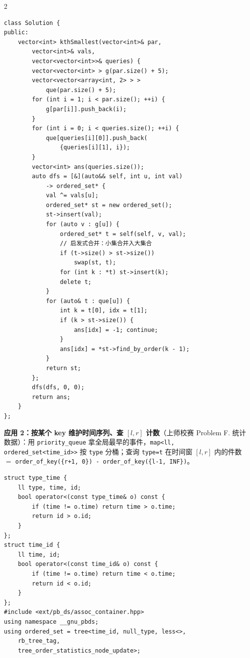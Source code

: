 \begin{multicols*}{2}
\begin{verbatim}
class Solution {
public:
    vector<int> kthSmallest(vector<int>& par,
        vector<int>& vals,
        vector<vector<int>>& queries) {
        vector<vector<int> > g(par.size() + 5);
        vector<vector<array<int, 2> > >
            que(par.size() + 5);
        for (int i = 1; i < par.size(); ++i) {
            g[par[i]].push_back(i);
        }
        for (int i = 0; i < queries.size(); ++i) {
            que[queries[i][0]].push_back(
                {queries[i][1], i});
        }
        vector<int> ans(queries.size());
        auto dfs = [&](auto&& self, int u, int val)
            -> ordered_set* {
            val ^= vals[u];
            ordered_set* st = new ordered_set();
            st->insert(val);
            for (auto v : g[u]) {
                ordered_set* t = self(self, v, val);
                // 启发式合并：小集合并入大集合
                if (t->size() > st->size())
                    swap(st, t);
                for (int k : *t) st->insert(k);
                delete t;
            }
            for (auto& t : que[u]) {
                int k = t[0], idx = t[1];
                if (k > st->size()) {
                    ans[idx] = -1; continue;
                }
                ans[idx] = *st->find_by_order(k - 1);
            }
            return st;
        };
        dfs(dfs, 0, 0);
        return ans;
    }
};
		\end{verbatim}

		\textbf{应用 2：按某个 key 维护时间序列、查 $[l, r]$ 计数}（上师校赛 Problem F. 统计数据）：用 \verb|priority_queue| 拿全局最早的事件，\verb|map<ll, ordered_set<time_id>>| 按 \verb|type| 分桶；查询 \verb|type=t| 在时间窗 $[l, r]$ 内的件数 $=$ \verb|order_of_key({r+1, 0}) - order_of_key({l-1, INF})|。

		\begin{verbatim}
struct type_time {
    ll type, time, id;
    bool operator<(const type_time& o) const {
        if (time != o.time) return time > o.time;
        return id > o.id;
    }
};
struct time_id {
    ll time, id;
    bool operator<(const time_id& o) const {
        if (time != o.time) return time < o.time;
        return id < o.id;
    }
};
#include <ext/pb_ds/assoc_container.hpp>
using namespace __gnu_pbds;
using ordered_set = tree<time_id, null_type, less<>,
    rb_tree_tag,
    tree_order_statistics_node_update>;


\end{verbatim}
\end{multicols*}
